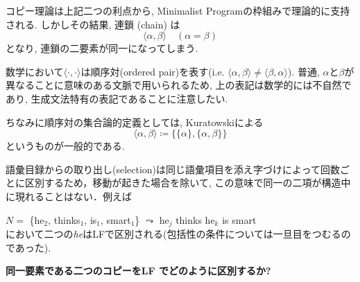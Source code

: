 \documentclass[dvipdfmx, xcolor={dvipsnames},12pt]{beamer}
\begin{document}
\begin{frame}
コピー理論は上記二つの利点から, Minimalist Programの枠組みで理論的に支持される. しかしその結果, 連鎖 (chain) は
\[
\langle \alpha, \beta \rangle \quad (\alpha = \beta)
\]
となり, 連鎖の二要素が同一になってしまう.

\begin{marker}
数学において$\langle \cdot, \cdot \rangle$は順序対(ordered pair)を表す(i.e. $\langle \alpha, \beta \rangle \neq \langle \beta, \alpha \rangle$). 普通, $\alpha$と$\beta$が異なることに意味のある文脈で用いられるため, 上の表記は数学的には不自然であり, 生成文法特有の表記であることに注意したい.

\medskip
ちなみに順序対の集合論的定義としては, Kuratowskiによる
\[
\langle \alpha, \beta \rangle \coloneq \{\{\alpha\}, \{\alpha, \beta\}\}
\]
というものが一般的である.
\end{marker}

\end{frame}

\begin{frame}
\begin{marker}
語彙目録からの取り出し(selection)は同じ語彙項目を添え字づけによって回数ごとに区別するため，移動が起きた場合を除いて, この意味で同一の二項が構造中に現れることはない．例えば
\medskip

$N =$ \{he$_{2}$, thinks$_{1}$, is$_{1}$, smart$_{1}$\} $\leadsto$ he$_{j}$ thinks he$_{k}$ is smart\\

において二つの\textit{he}はLFで区別される(包括性の条件については一旦目をつむるのであった).
\end{marker}


\vspace{1em}


\vspace{1em}

\hspace{1em}\textbf{同一要素である二つのコピーをLF でどのように区別するか?}


\end{frame}
\end{document}
